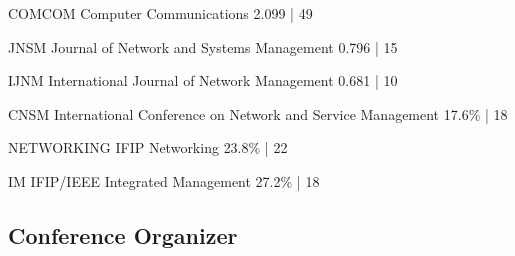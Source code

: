 \documentclass[print]{styles/friggeri-cv-mac} %
\begin{document}
\begin{entrylist}
\vspace{-0.3cm}
\entry
{COMCOM} %
{Computer Communications}
{2.099 | 49}

\vspace{-0.3cm}
\entry
{JNSM} %
{Journal of Network and Systems Management}
{0.796 | 15}

\vspace{-0.3cm}
\entry
{IJNM} %
{International Journal of Network Management}
{0.681 | 10}

\vspace{-0.3cm}
\entry
{CNSM} %
{International Conference on Network and Service Management}
{17.6\% | 18}

\vspace{-0.3cm}
\entry
{NETWORKING} %
{IFIP Networking}
{23.8\% | 22 }

\vspace{-0.3cm}
\entry
{IM} %
{IFIP/IEEE Integrated Management}
{27.2\% | 18}


\end{entrylist}



\newpage
\subsection{Conference Organizer}\vspace{-5pt}
\end{document}
